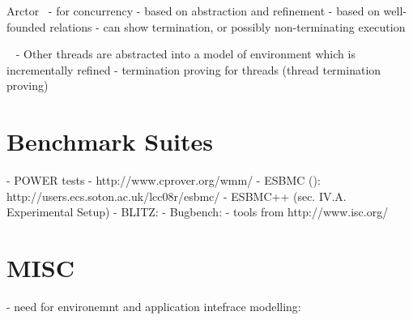 Arctor~\cite{Kupriyanov2014}
- for concurrency
- based on abstraction and refinement
- based on well-founded relations
- can show termination, or possibly non-terminating execution


~\cite{Cook2007thr}
- Other threads are abstracted into a model of environment which is incrementally refined
- termination proving for threads (thread termination proving)


\section{Benchmark Suites}

- \cite{Sarkar2011,MadorHaim2012} POWER tests
- http://www.cprover.org/wmm/
- ESBMC (\cite{Cordeiro2011}): http://users.ecs.soton.ac.uk/lcc08r/esbmc/
- ESBMC++ \cite{Ramalho2016:19,6,27,.} (sec. IV.A. Experimental Setup)
- BLITZ:
  - Bugbench: %
  - tools from http://www.isc.org/

\section{MISC}

- need for environemnt and application intefrace modelling: \cite{Cordeiro2016}

